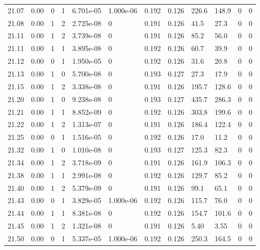 \documentclass[preview]{standalone}
\begin{document}
{{{{{{{{{{{{{{{{{\begin{tabular}{L{1.2cm}C{1.2cm} C{0.3cm}C{0.5cm} C{1.4cm}C{1.4cm} C{1.4cm}C{1.4cm} C{1.6cm}C{1.6cm} C{1.6cm}C{1.6cm}}
  21.07  &  0.00  & 0     &  1 &  6.701e-05  & 1.000e-06  &  0.192&   0.126& 226.6 & 148.9   &  0 & 0  \\ 
  21.08  &  0.00  & 1     &  2 &  2.725e-08  & 0  &  0.191&   0.126& 41.5 & 27.3   &  0 & 0  \\ 
  21.11  &  0.00  & 1     &  2 &  3.739e-08  & 0  &  0.191&   0.126& 85.2 & 56.0   &  0 & 0  \\ 
  21.11  &  0.00  & 1     &  1 &  3.895e-08  & 0  &  0.192&   0.126& 60.7 & 39.9   &  0 & 0  \\ 
  21.12  &  0.00  & 0     &  1 &  1.950e-05  & 0  &  0.192&   0.126& 31.6 & 20.8   &  0 & 0  \\ 
  21.13  &  0.00  & 1     &  0 &  5.700e-08  & 0  &  0.193&   0.127& 27.3 & 17.9   &  0 & 0  \\ 
  21.15  &  0.00  & 1     &  2 &  3.338e-08  & 0  &  0.191&   0.126& 195.7 & 128.6   &  0 & 0  \\ 
  21.20  &  0.00  & 1     &  0 &  9.238e-08  & 0  &  0.193&   0.127& 435.7 & 286.3   &  0 & 0  \\ 
  21.21  &  0.00  & 1     &  1 &  8.852e-09  & 0  &  0.192&   0.126& 303.8 & 199.6   &  0 & 0  \\ 
  21.22  &  0.00  & 1     &  2 &  1.313e-07  & 0  &  0.191&   0.126& 186.4 & 122.4   &  0 & 0  \\ 
  21.25  &  0.00  & 0     &  1 &  1.516e-05  & 0  &  0.192&   0.126& 17.0 & 11.2   &  0 & 0  \\ 
  21.32  &  0.00  & 1     &  0 &  1.010e-08  & 0  &  0.193&   0.127& 125.3 & 82.3   &  0 & 0  \\ 
  21.34  &  0.00  & 1     &  2 &  3.718e-09  & 0  &  0.191&   0.126& 161.9 & 106.3   &  0 & 0  \\ 
  21.38  &  0.00  & 1     &  1 &  2.991e-08  & 0  &  0.192&   0.126& 129.7 & 85.2   &  0 & 0  \\ 
  21.40  &  0.00  & 1     &  2 &  5.379e-09  & 0  &  0.191&   0.126& 99.1 & 65.1   &  0 & 0  \\ 
  21.43  &  0.00  & 0     &  1 &  3.829e-05  & 1.000e-06  &  0.192&   0.126& 115.7 & 76.0   &  0 & 0  \\ 
  21.44  &  0.00  & 1     &  1 &  8.381e-08  & 0  &  0.192&   0.126& 154.7 & 101.6   &  0 & 0  \\ 
  21.45  &  0.00  & 1     &  2 &  1.321e-08  & 0  &  0.191&   0.126& 5.40 & 3.55   &  0 & 0  \\ 
  21.50  &  0.00  & 0     &  1 &  5.337e-05  & 1.000e-06  &  0.192&   0.126& 250.3 & 164.5   &  0 & 0  \\ 

\end{tabular}}}}}}}}}}}}}}}}}}
\end{document}
